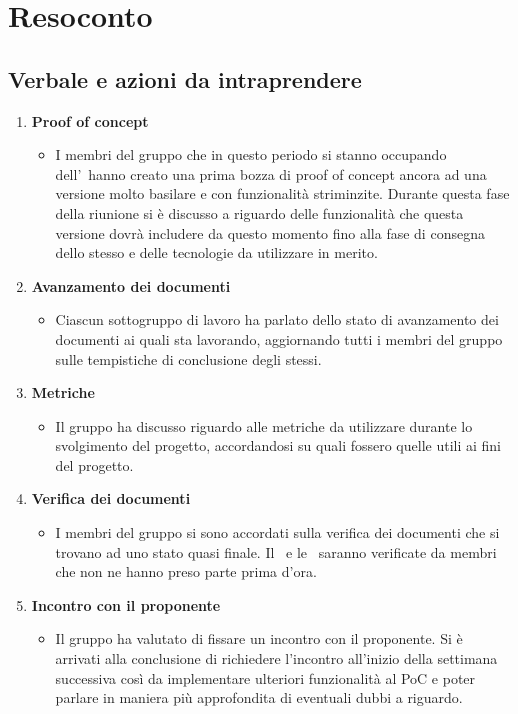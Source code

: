 \section{Resoconto}
\subsection{Verbale e azioni da intraprendere}
\begin{enumerate}
	\item \textbf{Proof of concept\glo}
	\begin{itemize}
		\item I membri del gruppo che in questo periodo si stanno occupando dell'\docNameAdRLow\ hanno creato una prima bozza di proof of concept\glo{} ancora ad una versione molto basilare e con funzionalità striminzite.
			  Durante questa fase della riunione si è discusso a riguardo delle funzionalità che questa versione dovrà includere da questo momento fino alla fase di consegna dello stesso e delle tecnologie da utilizzare
			  in  merito.
	\end{itemize}
	\item \textbf{Avanzamento dei documenti}
	\begin{itemize}
		\item Ciascun sottogruppo di lavoro ha parlato dello stato di avanzamento dei documenti ai quali sta lavorando, aggiornando tutti i membri del gruppo sulle tempistiche di conclusione degli stessi.
	\end{itemize}
	\item \textbf{Metriche}
	\begin{itemize}
		\item Il gruppo ha discusso riguardo alle metriche da utilizzare durante lo svolgimento del progetto, accordandosi su quali fossero quelle utili ai fini del progetto. 
	\end{itemize}
	\item \textbf{Verifica dei documenti}
	\begin{itemize}
		\item I membri del gruppo si sono accordati sulla verifica dei documenti che si trovano ad uno stato quasi finale. Il \docNamePdPLow\ e le \docNameNdPLow\ saranno verificate da membri che non ne hanno preso parte prima d'ora.
	\end{itemize}
	\item \textbf{Incontro con il proponente}
	\begin{itemize}
		\item Il gruppo ha valutato di fissare un incontro con il proponente. Si è arrivati alla conclusione di richiedere l'incontro all'inizio della settimana successiva così da implementare ulteriori funzionalità al PoC\glo{}
			  e poter parlare in maniera più approfondita di eventuali dubbi a riguardo.
	\end{itemize}
\end{enumerate}

